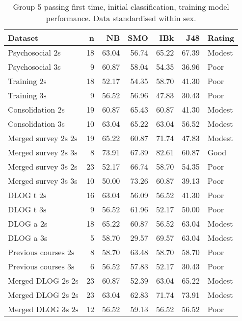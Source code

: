 \documentclass[
  12pt,
  a4paper,
]{book}
\begin{document}
\begin{table}[H]

\caption{\label{tab:g5-zsex-ftp-train-models}Group 5 passing first time, initial classification, training model performance. Data standardised within sex.}
\centering
\fontsize{10}{12}\selectfont
\begin{tabular}[t]{lrrrrrl}
\toprule
Dataset & n & NB & SMO & IBk & J48 & Rating\\
\midrule
\rowcolor{gray!6}  Psychosocial 2s & 18 & 63.04 & 56.74 & 65.22 & 67.39 & Modest\\
Psychosocial 3s & 9 & 60.87 & 58.04 & 54.35 & 36.96 & Poor\\
\rowcolor{gray!6}  Training 2s & 18 & 52.17 & 54.35 & 58.70 & 41.30 & Poor\\
Training 3s & 9 & 56.52 & 56.96 & 47.83 & 30.43 & Poor\\
\rowcolor{gray!6}  Consolidation 2s & 19 & 60.87 & 65.43 & 60.87 & 41.30 & Modest\\
Consolidation 3s & 10 & 63.04 & 65.22 & 63.04 & 56.52 & Modest\\
\rowcolor{gray!6}  Merged survey 2s 2s & 19 & 65.22 & 60.87 & 71.74 & 47.83 & Modest\\
Merged survey 2s 3s & 8 & 73.91 & 67.39 & 82.61 & 60.87 & Good\\
\rowcolor{gray!6}  Merged survey 3s 2s & 23 & 52.17 & 66.74 & 58.70 & 54.35 & Poor\\
Merged survey 3s 3s & 10 & 50.00 & 73.26 & 60.87 & 39.13 & Poor\\
\rowcolor{gray!6}  DLOG t 2s & 16 & 63.04 & 56.09 & 56.52 & 41.30 & Poor\\
DLOG t 3s & 9 & 56.52 & 61.96 & 52.17 & 50.00 & Poor\\
\rowcolor{gray!6}  DLOG a 2s & 18 & 65.22 & 60.87 & 56.52 & 63.04 & Modest\\
DLOG a 3s & 5 & 58.70 & 29.57 & 69.57 & 63.04 & Modest\\
\rowcolor{gray!6}  Previous courses 2s & 8 & 58.70 & 63.48 & 58.70 & 58.70 & Poor\\
Previous courses 3s & 6 & 56.52 & 57.83 & 52.17 & 30.43 & Poor\\
\rowcolor{gray!6}  Merged DLOG 2s 2s & 23 & 60.87 & 52.39 & 63.04 & 65.22 & Modest\\
Merged DLOG 2s 2s & 23 & 63.04 & 62.83 & 71.74 & 73.91 & Modest\\
\rowcolor{gray!6}  Merged DLOG 3s 2s & 12 & 56.52 & 59.13 & 56.52 & 56.52 & Poor\\

\end{tabular}
\end{table}
\end{document}
